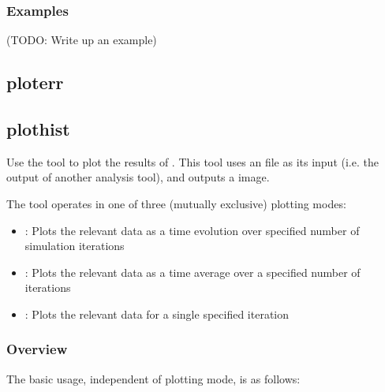 \documentclass[letterpaper,10pt,english]{sphinxmanual}
\begin{document}
\subsubsection{Examples}
\label{\detokenize{users_guide/command_line_tools/w_truncate:examples}}
(TODO: Write up an example)


\subsection{ploterr}
\label{\detokenize{users_guide/command_line_tools/ploterr:ploterr}}\label{\detokenize{users_guide/command_line_tools/ploterr:id1}}\label{\detokenize{users_guide/command_line_tools/ploterr::doc}}

\subsection{plothist}
\label{\detokenize{users_guide/command_line_tools/plothist:plothist}}\label{\detokenize{users_guide/command_line_tools/plothist:id1}}\label{\detokenize{users_guide/command_line_tools/plothist::doc}}
Use the  tool to plot the results of {\hyperref[\detokenize{users_guide/command_line_tools/w_pdist:w-pdist}]{}}. This tool uses
an  file as its input (i.e. the output of another analysis tool), and
outputs a  image.

The  tool operates in one of three (mutually exclusive)
plotting modes:
\begin{itemize}
\item {} 
: Plots the relevant data as a time evolution over
specified number of simulation iterations

\item {} 
: Plots the relevant data as a time average over a
specified number of iterations

\item {} 
: Plots the relevant data for a single specified
iteration

\end{itemize}


\subsubsection{Overview}
\label{\detokenize{users_guide/command_line_tools/plothist:overview}}
The basic usage, independent of plotting mode, is as follows:
\end{document}

